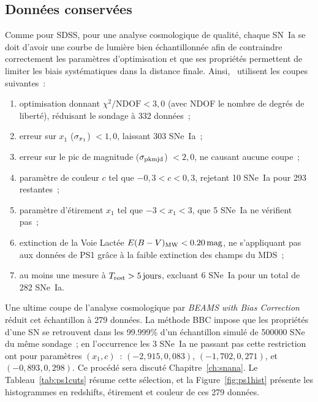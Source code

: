 \documentclass[../main/main.tex]{subfiles}
\begin{document}
\subsection{Données conservées}\label{sec:ps1data}

Comme pour SDSS, pour une analyse cosmologique de qualité, chaque SN~Ia se doit
d'avoir une courbe de lumière bien échantillonnée afin de contraindre
correctement les paramètres d'optimisation et que ses propriétés
permettent de limiter les biais systématiques dans la distance finale.
Ainsi,~\cite{scolnic2018} utilisent les coupes suivantes~:
\begin{enumerate}
    \item optimisation donnant $\chi^2/\mathrm{NDOF} < 3,0$ (avec NDOF le nombre
        de degrés de liberté), réduisant le sondage à 332 données~;
    \item erreur sur $x_1$ ($\sigma_{x_1}$) $< 1,0$, laissant 303 SNe~Ia~;
    \item erreur sur le pic de magnitude ($\sigma_{\rm pkmjd}$) $< 2,0$, ne causant
        aucune coupe~;
    \item paramètre de couleur $c$ tel que $-0,3 < c < 0,3$, rejetant 10 SNe~Ia
        pour 293 restantes~;
    \item paramètre d'étirement $x_1$ tel que $-3 < x_1 < 3$, que 5 SNe~Ia ne
        vérifient pas~;
    \item extinction de la Voie Lactée $E(B-V)_{\rm MW}< \SI{0,20}{mag}$, ne
        s'appliquant pas aux données de PS1 grâce à la faible extinction des
        champs du MDS~;
    \item au moins une mesure à $T_{\rm rest} > \SI{5}{jours}$, excluant 6
        SNe~Ia pour un total de 282 SNe~Ia.
\end{enumerate}
Une ultime coupe de l'analyse cosmologique par \textit{BEAMS with Bias
Correction} \citep[BBC,][]{kessler2017} réduit cet échantillon à 279 données. La
méthode BBC impose que les propriétés d'une SN se retrouvent dans les 99.999\%
d'un échantillon simulé de \num{500 000} SNe du même sondage~; en l'occurrence
les 3 SNe~Ia ne passant pas cette restriction ont pour paramètres $(x_1,c)$~:
$(−2,915, 0,083)$, $(−1,702, 0,271)$, et $(−0,893, 0,298)$. Ce procédé sera
discuté Chapitre~\ref{ch:snana}. Le Tableau~\ref{tab:ps1cuts} résume cette
sélection, et la Figure~\ref{fig:ps1hist} présente les histogrammes en
redshifts, étirement et couleur de ces 279 données.
\end{document}
